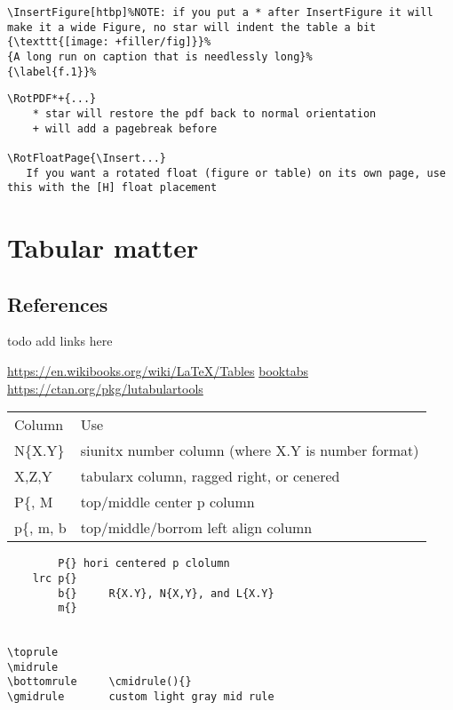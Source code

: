 \documentclass{corpboreport}
\begin{document}
\lstset{language=tex}
\begin{lstlisting}
\InsertFigure[htbp]%NOTE: if you put a * after InsertFigure it will make it a wide Figure, no star will indent the table a bit
{\texttt{[image: +filler/fig]}}%
{A long run on caption that is needlessly long}%
{\label{f.1}}%
\end{lstlisting}



\lstset{language=tex}
\begin{lstlisting}
\RotPDF*+{...}
	* star will restore the pdf back to normal orientation
	+ will add a pagebreak before

\RotFloatPage{\Insert...}
   If you want a rotated float (figure or table) on its own page, use this with the [H] float placement
\end{lstlisting}



\section{Tabular matter}

\subsection{References}

todo add links here

	\url{https://en.wikibooks.org/wiki/LaTeX/Tables}
	\url{booktabs}
\url{https://ctan.org/pkg/lutabulartools}

	\begin{tabular}{l l}\toprule
		Column & Use \\
		N\{X.Y\} & siunitx number column (where X.Y is number format)\\
		X,Z,Y & tabularx column, ragged right, or cenered\\
		P\{, M & top/middle center p column\\
		p\{, m, b & top/middle/borrom left align column\\
		\bottomrule
		\end{tabular}

\begin{lstlisting}
		P{} hori centered p clolumn
	lrc	p{}
		b{}		R{X.Y}, N{X,Y}, and L{X.Y}
		m{}


\toprule
\midrule
\bottomrule		\cmidrule(){}
\gmidrule		custom light gray mid rule

\end{lstlisting}
\end{document}
